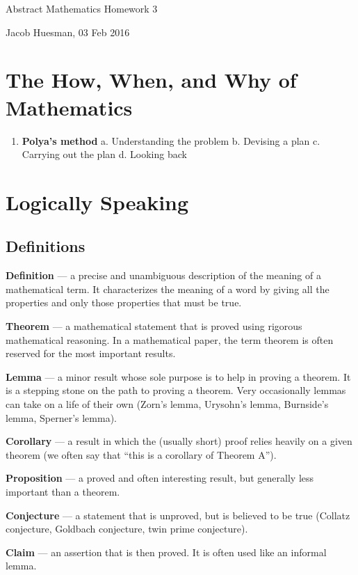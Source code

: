 \documentclass{article}
\begin{document}
\centerline{\sc \large Abstract Mathematics Homework 3}
\vspace{.5pc}
\centerline{\sc Jacob Huesman, 03 Feb 2016}

\vspace{2pc}


\section{The How, When, and Why of Mathematics}
\begin{enumerate}
	\item \textbf{Polya's method}
		\subitem a. Understanding the problem
		\subitem b. Devising a plan
		\subitem c. Carrying out the plan
		\subitem d. Looking back
\end{enumerate} 
	

\section{Logically Speaking}
\subsection{Definitions}
\textbf{Definition} — a precise and unambiguous description of the meaning of a mathematical term.  It characterizes the meaning of a word by giving all the properties and only those properties that must be true.

\textbf{Theorem} — a mathematical statement that is proved using rigorous mathematical reasoning.  In a mathematical paper, the term theorem is often reserved for the most important results.

\textbf{Lemma} — a minor result whose sole purpose is to help in proving a theorem.  It is a stepping stone on the path to proving a theorem. Very occasionally lemmas can take on a life of their own (Zorn’s lemma, Urysohn’s lemma, Burnside’s lemma, Sperner’s lemma).

\textbf{Corollary} — a result in which the (usually short) proof relies heavily on a given theorem (we often say that “this is a corollary of Theorem A”).

\textbf{Proposition} — a proved and often interesting result, but generally less important than a theorem.

\textbf{Conjecture} — a statement that is unproved, but is believed to be true (Collatz conjecture, Goldbach conjecture, twin prime conjecture).

\textbf{Claim} — an assertion that is then proved.  It is often used like an informal lemma.
\end{document}

